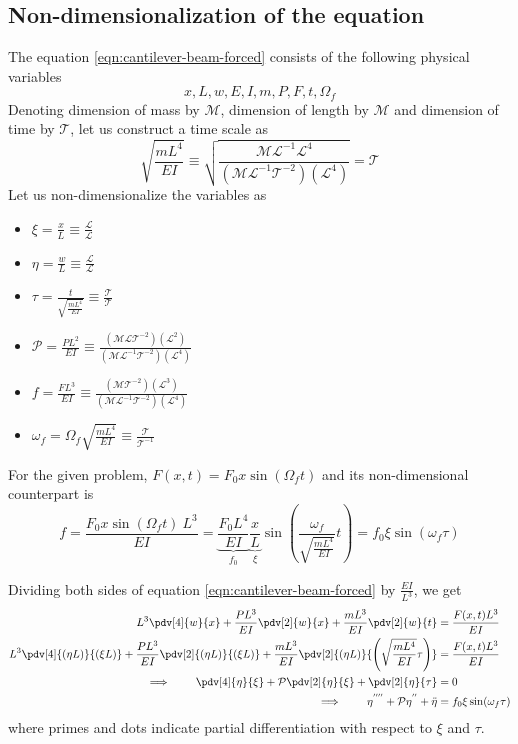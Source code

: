\subsection{Non-dimensionalization of the equation} The equation \ref{eqn:cantilever-beam-forced} consists of the following physical variables
$$x, L, w, E, I, m, P, F, t, \Omega_f$$
Denoting dimension of mass by $\mathcal{M}$, dimension of length by $\mathcal{M}$ and dimension of time by $\mathcal{T}$, let us construct a time scale as 
$$\sqrt{\frac{mL^4}{EI}} \equiv \sqrt{\frac{\mathcal{ML}^{-1}\mathcal{L}^4}{(\mathcal{M}\mathcal{L}^{-1}\mathcal{T}^{-2})(\mathcal{L}^4)}} = \mathcal{T}$$
Let us non-dimensionalize the variables as

\begin{minipage}{0.5\textwidth}
	\begin{itemize}
		\item $\xi = \frac{x}{L} \equiv \frac{\mathcal{L}}{\mathcal{L}}$
		\item $\eta = \frac{w}{L} \equiv \frac{\mathcal{L}}{\mathcal{L}}$
		\item $\tau = \frac{t}{\sqrt{\frac{mL^4}{EI}}} \equiv \frac{\mathcal{T}}{\mathcal{T}}$
		\item $\mathcal{P} = \frac{PL^2}{EI} \equiv \frac{(\mathcal{M}\mathcal{L}\mathcal{T}^{-2})(\mathcal{L}^2)}{(\mathcal{M}\mathcal{L}^{-1}\mathcal{T}^{-2})(\mathcal{L}^4)}$
		\item $f = \frac{FL^3}{EI} \equiv \frac{(\mathcal{M}\mathcal{T}^{-2})(\mathcal{L}^3)}{(\mathcal{M}\mathcal{L}^{-1}\mathcal{T}^{-2})(\mathcal{L}^4)}$
		\item $\omega_f = \Omega_f\sqrt{\frac{mL^4}{EI}} \equiv \frac{\mathcal{T}}{\mathcal{T}^{-1}}$
	\end{itemize}
\end{minipage}

For the given problem, $F(x,t) = F_0 x \sin (\Omega_f t)$ and its non-dimensional counterpart is 
$$f = \frac{F_0 x \sin (\Omega_f t)~L^3}{EI} = \underbrace{\frac{F_0 L^4}{EI}}_{f_0}\underbrace{\frac{x}{L}}_\xi\sin (\frac{\omega_f}{\sqrt{\frac{mL^4}{EI}}} t) = f_0\xi \sin(\omega_f \tau)$$

Dividing both sides of equation \ref{eqn:cantilever-beam-forced} by $\frac{EI}{L^3}$, we get
\begin{align*}
L^3\pdv[4]{w}{x} + \frac{PL^3}{EI}\pdv[2]{w}{x} + \frac{mL^3}{EI}\pdv[2]{w}{t} &= \frac{F(x,t)L^3}{EI} \\
L^3\pdv[4]{(\eta L)}{(\xi L)} + \frac{PL^3}{EI}\pdv[2]{(\eta L)}{(\xi L)} + \frac{mL^3}{EI}\pdv[2]{(\eta L)}{\left(\sqrt{\frac{mL^4}{EI}}\tau\right) } &= \frac{F(x,t)L^3}{EI} \\
\implies \qquad \pdv[4]{\eta }{\xi} + \mathcal{P}\pdv[2]{\eta}{\xi} + \pdv[2]{\eta }{\tau} &= 0 \\
\implies \qquad \eta^{''''} + \mathcal{P} \eta^{''} + \ddot{\eta} &= f_0\xi \sin(\omega_f \tau) 
\end{align*}
where primes and dots indicate partial differentiation with respect to $\xi$ and $\tau$.


